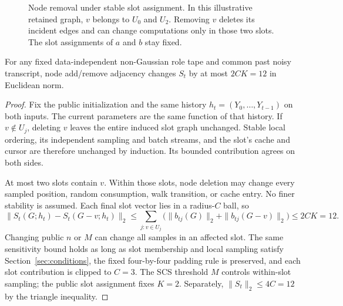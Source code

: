 \begin{figure}[!htbp]
\centering

\caption[Node removal under stable slot assignment]{Node removal under stable slot assignment. In this illustrative retained graph, $v$ belongs to $U_0$ and $U_2$. Removing $v$ deletes its incident edges and can change computations only in those two slots. The slot assignments of $a$ and $b$ stay fixed.}
\label{fig:pdp-slot-locality}
\end{figure}

\begin{lemma}\label{lem:sensitivity}
For any fixed data-independent non-Gaussian role tape and common past noisy transcript, node add/remove adjacency changes $S_t$ by at most $2CK=12$ in Euclidean norm.
\end{lemma}
\begin{proof}
Fix the public initialization and the same history $h_t=(Y_0,\ldots,Y_{t-1})$ on both inputs. The current parameters are the same function of that history. If $v\notin U_j$, deleting $v$ leaves the entire induced slot graph unchanged. Stable local ordering, its independent sampling and batch streams, and the slot's cache and cursor are therefore unchanged by induction. Its bounded contribution agrees on both sides.

At most two slots contain $v$. Within those slots, node deletion may change every sampled position, random consumption, walk transition, or cache entry. No finer stability is assumed. Each final slot vector lies in a radius-$C$ ball, so
\begin{equation}
 \|S_t(G;h_t)-S_t(G-v;h_t)\|_2
 \leq\sum_{j:v\in U_j}\bigl(\|b_{tj}(G)\|_2+\|b_{tj}(G-v)\|_2\bigr)
 \leq 2CK=12.
\end{equation}
Changing public $n$ or $M$ can change all samples in an affected slot. The same sensitivity bound holds as long as slot membership and local sampling satisfy Section~\ref{sec:conditions}, the fixed four-by-four padding rule is preserved, and each slot contribution is clipped to $C=3$. The SCS threshold $M$ controls within-slot sampling; the public slot assignment fixes $K=2$. Separately, $\|S_t\|_2\leq4C=12$ by the triangle inequality.
\end{proof}

